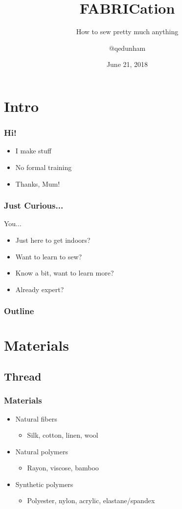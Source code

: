 \documentclass{beamer}
\title{FABRICation}
\subtitle{How to sew pretty much anything}
\author{$@$qedunham}
\institute{ToorCamp 2018}
\date{June 21, 2018}
\begin{document}
\begin{frame}[fragile]
\titlepage
\end{frame}

\section{Intro}

\begin{frame}[fragile]
\frametitle{Hi!}
\begin{itemize}[<+(1)->]
\item I make stuff
\item No formal training
\item Thanks, Mum!
\end{itemize}
\end{frame}

\begin{frame}[fragile]
\frametitle{Just Curious...}
You...
\begin{itemize}[<+(1)->]
\item Just here to get indoors?
\item Want to learn to sew?
\item Know a bit, want to learn more?
\item Already expert?
\end{itemize}
\end{frame}

\begin{frame}[fragile]
\frametitle{Outline}
\tableofcontents[pausesections]
\end{frame}

\section{Materials}

\begin{frame}[fragile]
\tableofcontents[currentsection]
\end{frame}

\subsection{Thread}

\begin{frame}[fragile]
\frametitle{Materials}
\begin{itemize}[<+(1)->]
\item Natural fibers
    \begin{itemize}
        \item Silk, cotton, linen, wool
    \end{itemize}
\item Natural polymers
    \begin{itemize}
        \item Rayon, viscose, bamboo
    \end{itemize}
\item Synthetic polymers
    \begin{itemize}
        \item Polyester, nylon, acrylic, elastane/spandex
    \end{itemize}
\end{itemize}
\end{frame}
\end{document}
